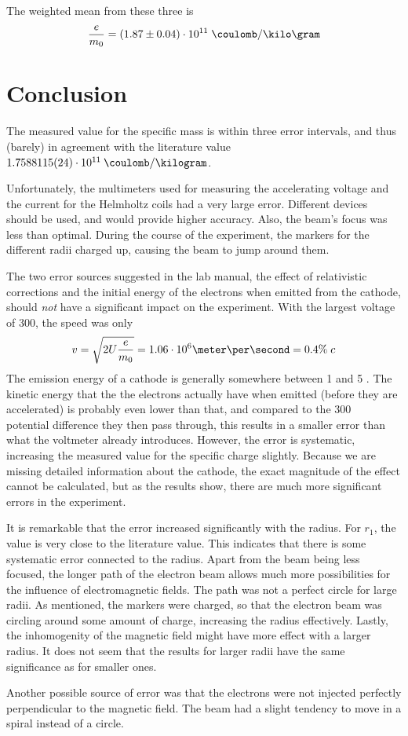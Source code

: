 \documentclass[a4paper,10pt]{article}
\begin{document}
The weighted mean from these three is
\begin{equation*}
\frac{e}{m_0} = (1.87 \pm 0.04) \cdot 10^{11} \; \coulomb/\kilo\gram
\end{equation*}



\section{Conclusion}
The measured value for the specific mass is within three error intervals, and thus  (barely) in agreement with the literature value $1.7588115(24) \cdot 10^{11} \: \coulomb/\kilogram$.

Unfortunately, the multimeters used for measuring the accelerating voltage and the current for the Helmholtz coils had a very large error. Different devices should be used, and would provide higher accuracy. Also, the beam's focus was less than optimal. During the course of the experiment, the markers for the different radii charged up, causing the beam to jump around them.

The two error sources suggested in the lab manual, the effect of relativistic corrections and the initial energy of the electrons when emitted from the cathode, should \emph{not} have a significant impact on the experiment. With the largest voltage of \unit{300}{\volt}, the speed was only
\begin{equation*}
v = \sqrt{2 U \frac{e}{m_0}} = 1.06 \cdot 10^6 \meter\per\second = 0.4\% \; c
\end{equation*}
The emission energy of a cathode is generally somewhere between 1 and 5 \electronvolt. The kinetic energy that the the electrons actually have when emitted (before they are accelerated) is probably even lower than that, and compared to the 300~\volt{} potential difference they then pass through, this results in a smaller error than what the voltmeter already introduces. However, the error is systematic, increasing the measured value for the specific charge slightly. Because we are missing detailed information about the cathode, the exact magnitude of the effect cannot be calculated, but as the results show, there are much more significant errors in the experiment.

It is remarkable that the error increased significantly with the radius. For $r_1$, the value is very close to the literature value. This indicates that there is some systematic error connected to the radius. Apart from the beam being less focused, the longer path of the electron beam allows much more possibilities for the influence of electromagnetic fields. The path was not a perfect circle for large radii. As mentioned, the markers were charged, so that the electron beam was circling around some amount of charge, increasing the radius effectively. Lastly, the inhomogenity of the magnetic field might have more effect with a larger radius. It does not seem that the results for larger radii have the same significance as for smaller ones.

Another possible source of error was that the electrons were not injected perfectly perpendicular to the magnetic field. The beam had a slight tendency to move in a spiral instead of a circle.
\end{document}
